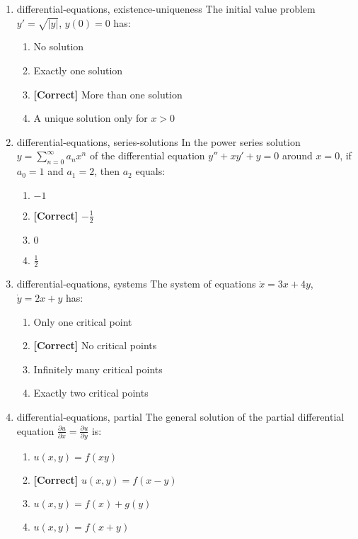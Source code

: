 \documentclass{article}
\newenvironment{problem}{\item}{}
\newcommand{\choice}{\item}
\newcommand{\correctchoice}{\item \textbf{[Correct] }}
\newcommand{\tags}[1]{#1} %
\begin{document}
\begin{enumerate}
        \begin{problem}
            \tags{differential-equations, existence-uniqueness}
            The initial value problem $y' = \sqrt{|y|}$, $y(0) = 0$ has:
            \begin{enumerate}
                \choice No solution
                \choice Exactly one solution
                \correctchoice More than one solution
                \choice A unique solution only for $x > 0$
            \end{enumerate}
        \end{problem}
        
        \begin{problem}
            \tags{differential-equations, series-solutions}
            In the power series solution $y = \sum_{n=0}^{\infty} a_n x^n$ of the differential equation $y'' + xy' + y = 0$ around $x = 0$, if $a_0 = 1$ and $a_1 = 2$, then $a_2$ equals:
            \begin{enumerate}
                \choice $-1$
                \correctchoice $-\frac{1}{2}$
                \choice $0$
                \choice $\frac{1}{2}$
            \end{enumerate}
        \end{problem}
        
        \begin{problem}
            \tags{differential-equations, systems}
            The system of equations $\dot{x} = 3x + 4y$, $\dot{y} = 2x + y$ has:
            \begin{enumerate}
                \choice Only one critical point
                \correctchoice No critical points
                \choice Infinitely many critical points
                \choice Exactly two critical points
            \end{enumerate}
        \end{problem}
        
        \begin{problem}
            \tags{differential-equations, partial}
            The general solution of the partial differential equation $\frac{\partial u}{\partial x} = \frac{\partial u}{\partial y}$ is:
            \begin{enumerate}
                \choice $u(x,y) = f(xy)$
                \correctchoice $u(x,y) = f(x-y)$
                \choice $u(x,y) = f(x) + g(y)$
                \choice $u(x,y) = f(x+y)$
            \end{enumerate}
        \end{problem}
        

\end{enumerate}
\end{document}
